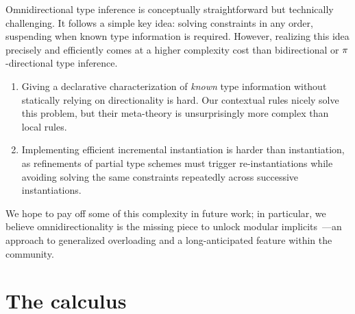 \documentclass[acmsmall,screen,nonacm%
\Anonymous{,anonymous}{}%
\Final{}{,review}%
]{acmart}
\begin{document}
Omnidirectional type inference is conceptually straightforward but technically
challenging. It follows a simple key idea: solving constraints in any order,
suspending when known type information is required. However, realizing this
idea precisely and efficiently comes at a higher complexity cost than
bidirectional or $\pi$-directional type inference.

\begin{enumerate}
\item[(\cref{sec/oml})]
  Giving a declarative characterization of \emph{known} type information
  without statically relying on directionality is hard. Our contextual rules
  nicely solve this problem, but their meta-theory is unsurprisingly more
  complex than local rules.

\item[(\cref{sec:implementation})]

  Implementing efficient incremental instantiation is harder than \ML
    instantiation, as refinements of partial type schemes must trigger
    re-instantiations while avoiding solving the same constraints 
    repeatedly across successive instantiations.

\end{enumerate}
We hope to pay off some of this complexity in future work; in particular, we
believe omnidirectionality is the missing piece to unlock modular
implicits~\citep*{White-Bour-Yallop/Modular_Implicits/ml2014}---an approach to
generalized overloading and a long-anticipated feature within the \OCaml
community.


\section{The \OML calculus}
\label{sec/oml}
\end{document}
